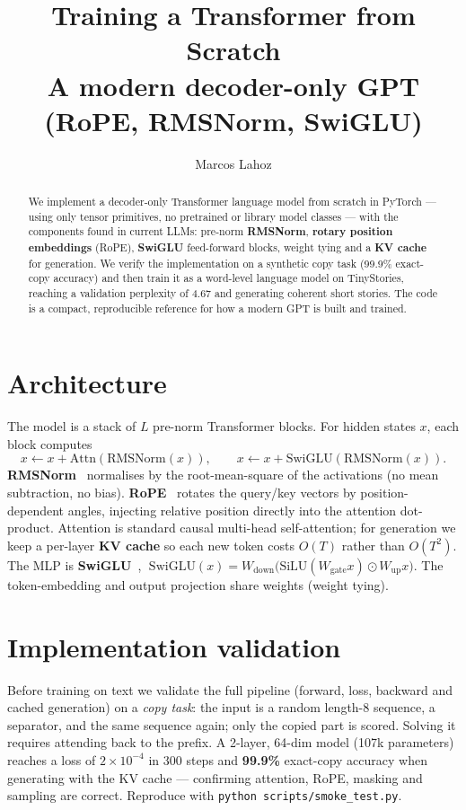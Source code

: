 \documentclass[11pt,a4paper]{article}
\title{\textbf{Training a Transformer from Scratch}\\
\large A modern decoder-only GPT (RoPE, RMSNorm, SwiGLU)}
\author{Marcos Lahoz}\date{}
\begin{document}
\maketitle

\begin{abstract}
We implement a decoder-only Transformer language model from scratch in PyTorch ---
using only tensor primitives, no pretrained or library model classes --- with the
components found in current LLMs: pre-norm \textbf{RMSNorm}, \textbf{rotary position
embeddings} (RoPE), \textbf{SwiGLU} feed-forward blocks, weight tying and a
\textbf{KV cache} for generation. We verify the implementation on a synthetic copy
task (99.9\% exact-copy accuracy) and then train it as a word-level language model on
TinyStories, reaching a validation perplexity of 4.67 and generating coherent short
stories. The code is a compact, reproducible reference for how a modern GPT is built
and trained.
\end{abstract}

\section{Architecture}
The model is a stack of $L$ pre-norm Transformer blocks. For hidden states $x$,
each block computes
\[
  x \leftarrow x + \mathrm{Attn}(\mathrm{RMSNorm}(x)), \qquad
  x \leftarrow x + \mathrm{SwiGLU}(\mathrm{RMSNorm}(x)).
\]
\textbf{RMSNorm}~\cite{rms} normalises by the root-mean-square of the activations
(no mean subtraction, no bias). \textbf{RoPE}~\cite{rope} rotates the query/key
vectors by position-dependent angles, injecting relative position directly into the
attention dot-product. Attention is standard causal multi-head self-attention; for
generation we keep a per-layer \textbf{KV cache} so each new token costs $O(T)$
rather than $O(T^2)$. The MLP is \textbf{SwiGLU}~\cite{swiglu},
$\;\mathrm{SwiGLU}(x)=W_{\text{down}}\big(\mathrm{SiLU}(W_{\text{gate}}x)\odot W_{\text{up}}x\big)$.
The token-embedding and output projection share weights (weight tying).

\section{Implementation validation}
Before training on text we validate the full pipeline (forward, loss, backward and
cached generation) on a \emph{copy task}: the input is a random length-$8$ sequence, a
separator, and the same sequence again; only the copied part is scored. Solving it
requires attending back to the prefix. A 2-layer, 64-dim model (107k parameters)
reaches a loss of $2\times10^{-4}$ in 300 steps and \textbf{99.9\%} exact-copy accuracy
when generating with the KV cache --- confirming attention, RoPE, masking and sampling
are correct. Reproduce with \texttt{python scripts/smoke\_test.py}.
\end{document}
